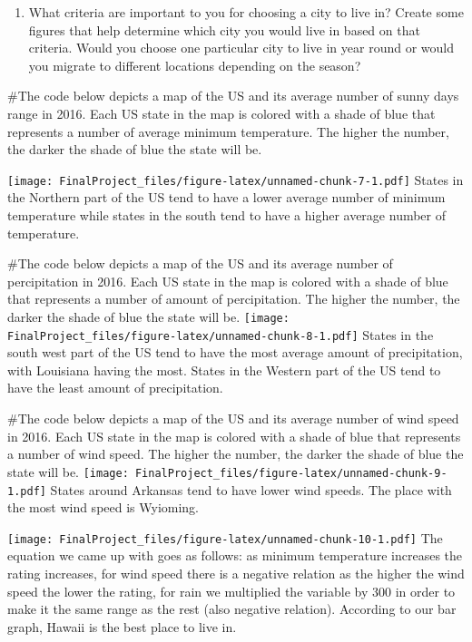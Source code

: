 \documentclass[
]{article}
\providecommand{\tightlist}{%
  \setlength{\itemsep}{0pt}\setlength{\parskip}{0pt}}
\begin{document}
\begin{enumerate}
\def\labelenumi{\arabic{enumi}.}
\setcounter{enumi}{2}
\tightlist
\item
  What criteria are important to you for choosing a city to live in?
  Create some figures that help determine which city you would live in
  based on that criteria. Would you choose one particular city to live
  in year round or would you migrate to different locations depending on
  the season?
\end{enumerate}

\#The code below depicts a map of the US and its average number of sunny
days range in 2016. Each US state in the map is colored with a shade of
blue that represents a number of average minimum temperature. The higher
the number, the darker the shade of blue the state will be.

\texttt{[image: FinalProject\_files/figure-latex/unnamed-chunk-7-1.pdf]}
States in the Northern part of the US tend to have a lower average
number of minimum temperature while states in the south tend to have a
higher average number of temperature.

\#The code below depicts a map of the US and its average number of
percipitation in 2016. Each US state in the map is colored with a shade
of blue that represents a number of amount of percipitation. The higher
the number, the darker the shade of blue the state will be.
\texttt{[image: FinalProject\_files/figure-latex/unnamed-chunk-8-1.pdf]}
States in the south west part of the US tend to have the most average
amount of precipitation, with Louisiana having the most. States in the
Western part of the US tend to have the least amount of precipitation.

\#The code below depicts a map of the US and its average number of wind
speed in 2016. Each US state in the map is colored with a shade of blue
that represents a number of wind speed. The higher the number, the
darker the shade of blue the state will be.
\texttt{[image: FinalProject\_files/figure-latex/unnamed-chunk-9-1.pdf]}
States around Arkansas tend to have lower wind speeds. The place with
the most wind speed is Wyioming.

\texttt{[image: FinalProject\_files/figure-latex/unnamed-chunk-10-1.pdf]}
The equation we came up with goes as follows: as minimum temperature
increases the rating increases, for wind speed there is a negative
relation as the higher the wind speed the lower the rating, for rain we
multiplied the variable by 300 in order to make it the same range as the
rest (also negative relation). According to our bar graph, Hawaii is the
best place to live in.
\end{document}
